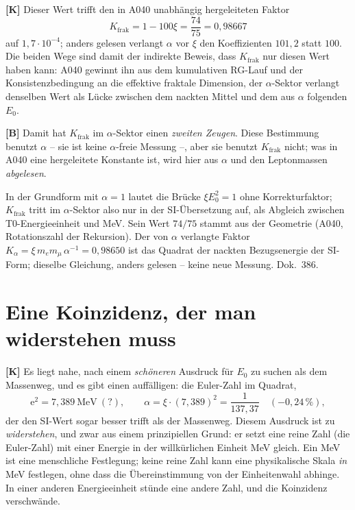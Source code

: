 \textbf{[K]} Dieser Wert trifft den in A040 unabhängig hergeleiteten Faktor
\[
  K_\text{frak} = 1 - 100\xi = \frac{74}{75} = 0{,}98667
\]
auf $1{,}7\cdot10^{-4}$; anders gelesen verlangt $\alpha$ vor $\xi$ den
Koeffizienten $101{,}2$ statt $100$. Die beiden Wege sind damit der
indirekte Beweis, dass $K_\text{frak}$ nur diesen Wert haben kann: A040 gewinnt ihn aus dem kumulativen RG-Lauf und der
Konsistenzbedingung an die effektive fraktale Dimension, der $\alpha$-Sektor
verlangt denselben Wert als Lücke zwischen dem nackten Mittel und dem aus
$\alpha$ folgenden $E_0$.

\textbf{[B]} Damit hat $K_\text{frak}$ im $\alpha$-Sektor einen \emph{zweiten
Zeugen}. Diese Bestimmung benutzt $\alpha$ -- sie ist keine $\alpha$-freie
Messung --, aber sie benutzt $K_\text{frak}$ nicht; was in A040 eine
hergeleitete Konstante ist, wird hier aus $\alpha$ und den Leptonmassen
\emph{abgelesen}.

In der Grundform mit $\alpha = 1$ lautet die Brücke $\xi E_0^2 = 1$ ohne Korrekturfaktor; $K_{\text{frak}}$ tritt im $\alpha$-Sektor also nur in der SI-Übersetzung auf, als Abgleich zwischen T0-Energieeinheit und MeV. Sein Wert $74/75$ stammt aus der Geometrie (A040, Rotationszahl der Rekursion). Der von $\alpha$ verlangte Faktor $K_\alpha = \xi\,m_e m_\mu\,\alpha^{-1} = 0{,}98650$ ist das Quadrat der nackten Bezugsenergie der SI-Form; dieselbe Gleichung, anders gelesen -- keine neue Messung. Dok.~386.

\section{Eine Koinzidenz, der man widerstehen muss}

\textbf{[K]} Es liegt nahe, nach einem \emph{schöneren} Ausdruck für $E_0$ zu
suchen als dem Massenweg, und es gibt einen auffälligen: die Euler-Zahl im
Quadrat,
\[
  \mathrm{e}^2 = 7{,}389\ \text{MeV}\ (?),\qquad
  \alpha = \xi\cdot(7{,}389)^2 = \frac{1}{137{,}37}\quad(-0{,}24\,\%),
\]
der den SI-Wert sogar besser trifft als der Massenweg. Diesem Ausdruck ist zu
\emph{widerstehen}, und zwar aus einem prinzipiellen Grund: er setzt eine reine
Zahl (die Euler-Zahl) mit einer Energie in der willkürlichen Einheit MeV gleich.
Ein MeV ist eine menschliche Festlegung; keine reine Zahl kann eine physikalische
Skala \emph{in} MeV festlegen, ohne dass die Übereinstimmung von der Einheitenwahl
abhinge. In einer anderen Energieeinheit stünde eine andere Zahl, und die
Koinzidenz verschwände.

